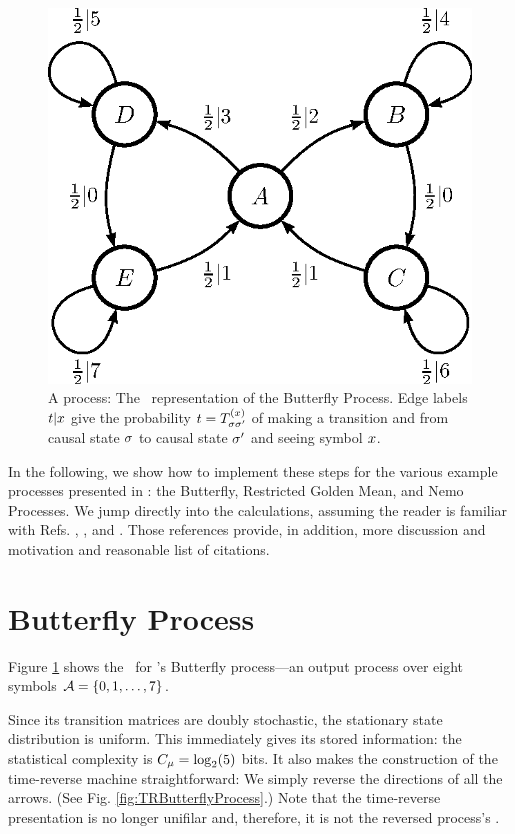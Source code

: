 \documentclass[prl,twocolumn,showpacs,superscriptaddress,preprintnumbers,floatfix]{revtex4}
\theoremstyle{plain}   \newtheorem{Lem}{Lemma}
\theoremstyle{plain} 	\newtheorem{Cor}{Corollary}
\theoremstyle{plain} 	\newtheorem{The}{Theorem}
\theoremstyle{plain} 	\newtheorem{Prop}{Proposition}
\theoremstyle{plain} 	\newtheorem*{Conj}{Conjecture}
\theoremstyle{plain}	\newtheorem*{Rem}{Remark}
\theoremstyle{plain}	\newtheorem*{Def}{Definition}
\theoremstyle{plain}	\newtheorem*{Not}{Notation}
\begin{document}
\begin{figure}[th]
\centering
\includegraphics{butterfly_feM_ur.eps}
\caption{A  process: The \eM\ representation of the Butterfly
  Process. Edge labels $t|{x}$ give the probability
  $t = T^{({x})}_{\sigma\sigma^{\prime}}$ of making a
  transition and from causal state $\sigma$ to causal state
  $\sigma^{\prime}$ and seeing symbol ${x}$.
  }
\label{fig:ButterflyProcess}
\end{figure}

In the following, we show how to implement these steps for the various example
processes presented in : the Butterfly, Restricted Golden Mean,
and Nemo Processes. We jump directly into the calculations, assuming the reader
is familiar with Refs. \cite{Crut08a}, \cite{Crut08b}, and \cite{Maho09a}.
Those references provide, in addition, more discussion and motivation and
reasonable list of citations.

\section{Butterfly Process}

Figure \ref{fig:ButterflyProcess} shows the \eM\ for 's
Butterfly process---an output process over eight symbols
$\mathcal{A} = \{0,1,\ldots,7\}$.

Since its transition matrices are doubly stochastic, the stationary state
distribution is uniform. This immediately gives its stored information: the
statistical complexity is $C_\mu = \log_2(5)$ bits. It also makes the
construction of the time-reverse machine straightforward: We simply reverse
the directions of all the arrows. (See Fig. \ref{fig:TRButterflyProcess}.)
Note that the time-reverse presentation is no longer unifilar and, therefore,
it is not the reversed process's \eM. 
\end{document}
